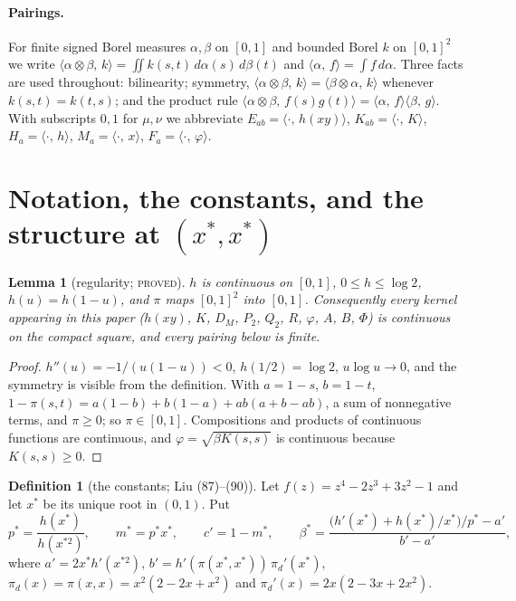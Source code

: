 \documentclass[11pt]{article}
\theoremstyle{plain}
\newtheorem{lemma}[theorem]{Lemma}
\theoremstyle{definition}
\newtheorem{definition}[theorem]{Definition}
\theoremstyle{remark}
\newcommand{\pr}[2]{\langle #1,\,#2\rangle}
\newcommand{\lbl}[1]{\textsc{#1}}
\begin{document}
\paragraph{Pairings.}
For finite signed Borel measures $\alpha,\beta$ on $[0,1]$ and bounded Borel
$k$ on $[0,1]^2$ we write $\pr{\alpha\otimes\beta}{k}=\iint k(s,t)\,
d\alpha(s)\,d\beta(t)$ and $\pr{\alpha}{f}=\int f\,d\alpha$.  Three facts are
used throughout: bilinearity; symmetry, $\pr{\alpha\otimes\beta}{k}=
\pr{\beta\otimes\alpha}{k}$ whenever $k(s,t)=k(t,s)$; and the product rule
$\pr{\alpha\otimes\beta}{f(s)g(t)}=\pr{\alpha}{f}\pr{\beta}{g}$.  With
subscripts $0,1$ for $\mu,\nu$ we abbreviate
$E_{ab}=\pr{\cdot}{h(xy)}$, $K_{ab}=\pr{\cdot}{K}$, $H_a=\pr{\cdot}{h}$,
$M_a=\pr{\cdot}{x}$, $F_a=\pr{\cdot}{\varphi}$.

\section{Notation, the constants, and the structure at \texorpdfstring{$(x^\ast,x^\ast)$}{(x*,x*)}}\label{sec:constants}

\begin{lemma}[regularity; \lbl{proved}]\label{lem:L0}
$h$ is continuous on $[0,1]$, $0\le h\le\log2$, $h(u)=h(1-u)$, and
$\pi$ maps $[0,1]^2$ into $[0,1]$.  Consequently every kernel appearing in
this paper ($h(xy)$, $K$, $D_M$, $P_2$, $Q_2$, $R$, $\varphi$, $A$, $B$,
$\Phi$) is continuous on the compact square, and every pairing below is
finite.
\end{lemma}
\begin{proof}
$h''(u)=-1/(u(1-u))<0$, $h(1/2)=\log2$, $u\log u\to0$, and the symmetry is
visible from the definition.  With $a=1-s$, $b=1-t$,
$1-\pi(s,t)=a(1-b)+b(1-a)+ab(a+b-ab)$, a sum of nonnegative terms, and
$\pi\ge0$; so $\pi\in[0,1]$.  Compositions and products of continuous
functions are continuous, and $\varphi=\sqrt{\beta K(s,s)}$ is continuous
because $K(s,s)\ge0$.
\end{proof}

\begin{definition}[the constants; Liu (87)--(90)]\label{def:constants}
Let $f(z)=z^4-2z^3+3z^2-1$ and let $x^\ast$ be its unique root in $(0,1)$.
Put
\[
  p^\ast=\frac{h(x^\ast)}{h(x^{\ast2})},\qquad m^\ast=p^\ast x^\ast,\qquad
  c'=1-m^\ast,\qquad
  \beta^\ast=\frac{\bigl(h'(x^\ast)+h(x^\ast)/x^\ast\bigr)/p^\ast-a'}{b'-a'},
\]
where $a'=2x^\ast h'(x^{\ast2})$, $b'=h'(\pi(x^\ast,x^\ast))\,\pi_d'(x^\ast)$,
$\pi_d(x)=\pi(x,x)=x^2(2-2x+x^2)$ and $\pi_d'(x)=2x(2-3x+2x^2)$.
\end{definition}
\end{document}
